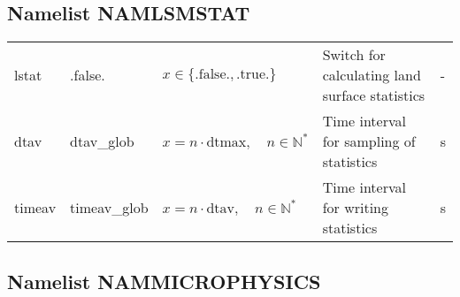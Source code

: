\documentclass[twoside,11pt,fleqn,a4paper,english,openright]{report}
\begin{document}
\subsection{Namelist NAMLSMSTAT}\label{par:lsmstat}
\begin{center}
  \tablelasttail{
        &&&&\\\hline
  }
\begin{supertabular}{|l|p{2cm}|p{4cm}|p{6cm}|l|}
  lstat		& .false.	& $x\in\{\text{.false.},\text{.true.}\}$	& Switch for calculating land surface statistics	& -\\
  dtav		& dtav\_glob	& $x = n \cdot \text{dtmax}, \quad n \in \mathbb{N}^*$	& Time interval for sampling of statistics	& s\\
  timeav	& timeav\_glob	& $x = n \cdot \text{dtav}, \quad n \in \mathbb{N}^*$	& Time interval for writing statistics		& s\\
\end{supertabular}
\end{center}

\newpage
\subsection{Namelist NAMMICROPHYSICS}\label{par:microphysics}
\end{document}

